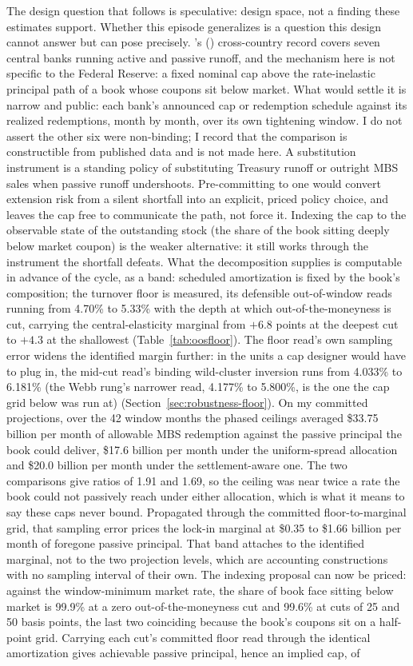 \documentclass[12pt]{article}
\newcommand{\citepos}[1]{\citeauthor{#1}'s (\citeyear{#1})}
\begin{document}
The design question that follows is speculative: design space, not a finding these estimates support. Whether this episode generalizes is a question this design cannot answer but can pose precisely. \citepos{du2024} cross-country record covers seven central banks running active and passive runoff, and the mechanism here is not specific to the Federal Reserve: a fixed nominal cap above the rate-inelastic principal path of a book whose coupons sit below market. What would settle it is narrow and public: each bank's announced cap or redemption schedule against its realized redemptions, month by month, over its own tightening window. I do not assert the other six were non-binding; I record that the comparison is constructible from published data and is not made here. A substitution instrument is a standing policy of substituting Treasury runoff or outright MBS sales when passive runoff undershoots. Pre-committing to one would convert extension risk from a silent shortfall into an explicit, priced policy choice, and leaves the cap free to communicate the path, not force it. Indexing the cap to the observable state of the outstanding stock (the share of the book sitting deeply below market coupon) is the weaker alternative: it still works through the instrument the shortfall defeats. What the decomposition supplies is computable in advance of the cycle, as a band: scheduled amortization is fixed by the book's composition; the turnover floor is measured, its defensible out-of-window reads running from 4.70\% to 5.33\% with the depth at which out-of-the-moneyness is cut, carrying the central-elasticity marginal from $+6.8$ points at the deepest cut to $+4.3$ at the shallowest (Table~\ref{tab:oosfloor}). The floor read's own sampling error widens the identified margin further: in the units a cap designer would have to plug in, the mid-cut read's binding wild-cluster inversion runs from 4.033\% to 6.181\% (the Webb rung's narrower read, 4.177\% to 5.800\%, is the one the cap grid below was run at) (Section~\ref{sec:robustness-floor}). On my committed projections, over the 42 window months the phased ceilings averaged \$33.75 billion per month of allowable MBS redemption against the passive principal the book could deliver, \$17.6 billion per month under the uniform-spread allocation and \$20.0 billion per month under the settlement-aware one. The two comparisons give ratios of 1.91 and 1.69, so the ceiling was near twice a rate the book could not passively reach under either allocation, which is what it means to say these caps never bound. Propagated through the committed floor-to-marginal grid, that sampling error prices the lock-in marginal at \$0.35 to \$1.66 billion per month of foregone passive principal. That band attaches to the identified marginal, not to the two projection levels, which are accounting constructions with no sampling interval of their own. The indexing proposal can now be priced: against the window-minimum market rate, the share of book face sitting below market is 99.9\% at a zero out-of-the-moneyness cut and 99.6\% at cuts of 25 and 50 basis points, the last two coinciding because the book's coupons sit on a half-point grid. Carrying each cut's committed floor read through the identical amortization gives achievable passive principal, hence an implied cap, of 
\end{document}
